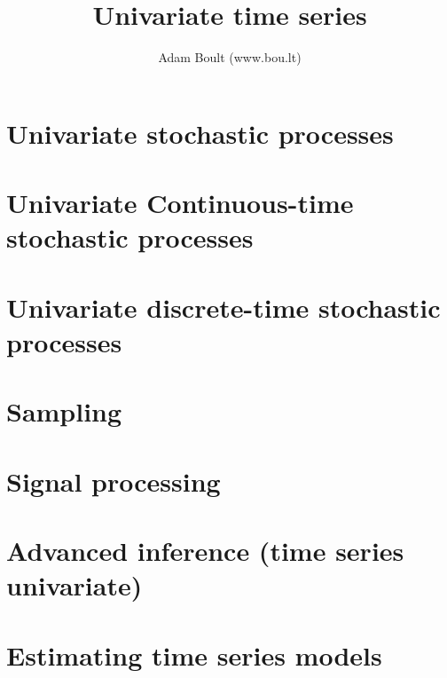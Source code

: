 \documentclass[oneside]{book}
\begin{document}
\author{Adam Boult (www.bou.lt)}
\title{Univariate time series}
\maketitle

\setcounter{tocdepth}{0}
\tableofcontents



\part{Univariate stochastic processes}







\part{Univariate Continuous-time stochastic processes}



\part{Univariate discrete-time stochastic processes}



\part{Sampling}




\part{Signal processing}






\part{Advanced inference (time series univariate)}


\part{Estimating time series models}





\end{document}
